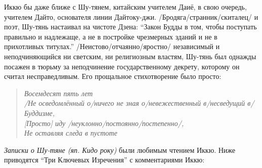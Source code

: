\begin{ver}
Иккю бы даже ближе с Шу-тянем, китайским учителем Даиё, в свою
очередь, учителем Дайто, основателя линии
Дайтоку-джи. /Бродяга/странник/скиталец/ и поэт, Шу-тянь настаивал на
чистоте Дзена: ``Закон Будды в том, чтобы поступать правильно и
надлежаще, а не в постройке чрезмерных зданий и не в
прихотливых титулах.''
/Неистово/отчаянно/яростно/ независимый и неподчиняющийся ни светским,
ни религиозным властям, Шу-тянь был однажды посажен в тюрьму за
неподчинение государственному декрету, которому он считал
несправедливым.
Его прощальное стихотворение было просто:
\end{ver}


\begin{ver}
  \begin{verse}\it
    Восемдесят пять лет\\
    /Не осведомлённый о/ничего не зная о/невежественный в/несведущий
    в/ Буддизме,\\{}
    [Просто] иду /неуклонно/постоянно/постепенно/,\\
    Не оставляя следа в пустоте
  \end{verse}
\end{ver}

\begin{ver}
  {\em Записки о Шу-тяне (яп. Кидо року)} были любимым чтением Иккю.
  Ниже приводятся ``Три Ключевых Изречения'' с комментариями Иккю: 
\end{ver}

